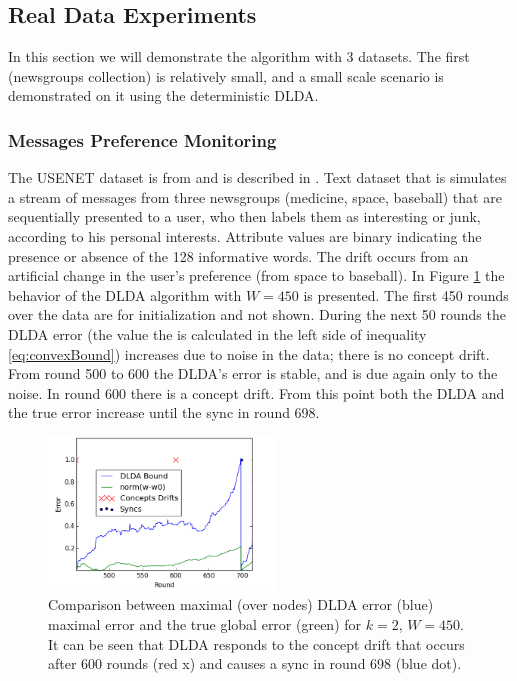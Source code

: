 \documentclass[11pt,twocolumn,varwidth=true,a4paper,fleqn]{article}
\begin{document}
\subsection{Real Data Experiments}
In this section we will demonstrate the algorithm with 3 datasets. The first
(newsgroups collection) is relatively small, and a small scale
scenario is demonstrated on it using the deterministic DLDA. 
\subsubsection{Messages Preference Monitoring}
The USENET dataset is from \cite{usenetSource} and is described in
\cite{usenet}.
Text dataset that is simulates a stream of messages from three newsgroups
(medicine, space, baseball) that are sequentially presented to a user, 
who then labels them as interesting or junk, according to his personal interests. 
Attribute values are binary indicating the presence or absence of the 128
informative words. The drift occurs from an artificial change in the user's
preference (from space to baseball). In Figure \ref{usenet} the behavior of the
DLDA algorithm with $W=450$ is presented. The first 450 rounds over the data are for
initialization and not shown. During the next 50 rounds the DLDA error 
(the value the is calculated in the left side of inequality
\ref{eq:convexBound}) increases due to noise in the data; there is
no concept drift. From round 500 to 600 the DLDA's error is stable, 
and is due again only to the noise. In round 600 there is a concept 
drift.
From this point both the DLDA and the true error increase until the 
sync in round 698.

\begin{figure}[h]
	\centering
	\includegraphics[width=60mm]{Usenet/DriftDetected.png}
	\caption{Comparison between maximal (over nodes) DLDA error (blue) maximal
	error and the true global error (green) for $k=2$, $W=450$. 
	It can be seen that DLDA responds to the concept drift that occurs 
	after 600 rounds (red x) and causes a sync in round 698 (blue dot).}
	\label{usenet}
	\end{figure}
	
\end{document}
